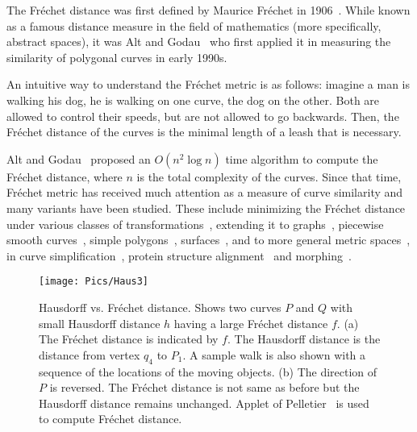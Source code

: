 \documentclass[12pt]{dalthesis}
\newcommand{\Frechet}{Fr\'echet }
\begin{document}
The \Frechet distance was first defined by Maurice \Frechet in 1906~\cite{FirstFD}. 
While known as a famous distance measure in the field of mathematics 
(more specifically, abstract spaces), 
it was Alt and Godau~\cite{AltG95} who first applied it in measuring the similarity of polygonal curves in early 1990s. 

An intuitive way to understand the \Frechet metric is as follows:
imagine a man is walking his
dog, he is walking on one curve, the dog on the other. Both are allowed to
control their speeds, but are not allowed to go backwards. Then, the \Frechet
distance of the curves is the minimal length of a leash that is necessary.







Alt and Godau~\cite{AltG95} proposed an $O(n^2 \log n)$ time 
algorithm to compute the \Frechet distance, 
where $n$ is the total complexity of the curves. 
Since that time,
\Frechet metric has received much attention as a measure
of curve similarity and many variants have been studied. These include 
minimizing the \Frechet distance under various classes of transformations~\cite{AltTranslation,Mosig2005}, 
extending it to graphs~\cite{AltERW03a,VehicleTracking}, piecewise smooth curves~\cite{smoothFD}, simple polygons~\cite{Buchin2006}, surfaces~\cite{Alt2009Surface}, and
to more general metric spaces~\cite{WenkC08a,Chambers10,Cook2009},
in curve simplification~\cite{Agarwal2002}, 
protein structure alignment~\cite{JiangXZ08,FDRevisited} and morphing~\cite{GuibasNoCross}. 

















\begin{figure}[h]
	\centering
	\texttt{[image: Pics/Haus3]}
	\caption{ Hausdorff vs. \Frechet distance. Shows two curves $P$ and $Q$ with small Hausdorff distance $h$ having a large \Frechet distance $f$.
	(a) The \Frechet distance is indicated by $f$. The Hausdorff distance is the distance from vertex $q_4$ to $P_1$. A sample walk is also shown with
a sequence of the locations of the moving objects.
(b) The direction of $P$ is reversed. The \Frechet distance is not same as before but the Hausdorff distance remains unchanged.
Applet of Pelletier~\cite{FDApplet} is used to compute \Frechet distance.
	}
	\label{fig:Haus}
\end{figure}
\end{document}
